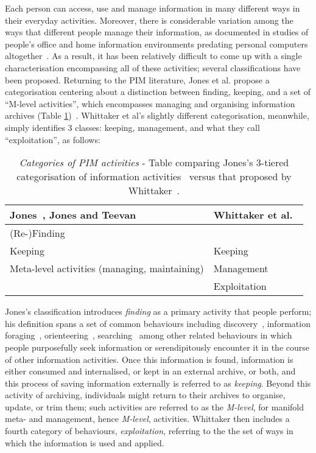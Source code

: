 \documentclass[graybox]{svmult}
\begin{document}
Each person can access, use and manage information in many different ways in their everyday activities.  Moreover, there is considerable variation among the ways that different people manage their information, as documented in studies of people's office and home information environments predating personal computers altogether~\cite{malone1983people}.  As a result, it has been relatively difficult to come up with a single characterisation encompassing all of these activities; several classifications have been proposed.  Returning to the PIM literature, Jones et al. propose a categorisation centering about a distinction between finding, keeping, and a set of ``M-level activities'', which encompasses managing and organising information archives (Table \ref{fig:pimactivities})~\cite{kftf}. Whittaker et al's slightly different categorisation, meanwhile, simply identifies 3 classes: keeping, management, and what they call ``exploitation'', as follows:

\begin{table}
\begin{center}
\begin{tabular}{p{4.5cm} | p{4.5cm}} 
Jones~\cite{kftf}, Jones and Teevan~\cite{teevan2006personal}& Whittaker et al.~\cite{whittaker2011personal}\\
\hline
(Re-)Finding &  \\
Keeping & Keeping \\
Meta-level activities (managing, maintaining) & Management \\
 & Exploitation \\
\end{tabular}
\caption{\emph{Categories of PIM activities} - Table comparing Jones's 3-tiered categorisation of information activities~\cite{kftf} versus that proposed by Whittaker~\cite{whittaker2011personal}.}
\label{fig:pimactivities}
\end{center}
\end{table}

Jones's classification introduces \emph{finding} as a primary activity that people perform; his definition spans a set of common behaviours including discovery~\cite{chi2001using}, information foraging~\cite{pirolli1999information}, orienteering~\cite{teevan2004perfect, benyon1997navigation}, searching~\cite{vakkari2003task} among other related behaviours in which people purposefully seek information or serendipitously encounter it in the course of other information activities.  Once this information is found, information is either consumed and internalised, or kept in an external archive, or both, and this process of saving information externally is referred to as \emph{keeping}.  Beyond this activity of archiving, individuals might return to their archives to organise, update, or trim them; such activities are referred to as the \emph{M-level}, for manifold meta- and management, hence \emph{M-level}, activities.  Whittaker then includes a fourth category of behaviours, \emph{exploitation}, referring to the the set of ways in which the information is used and applied.
\end{document}
